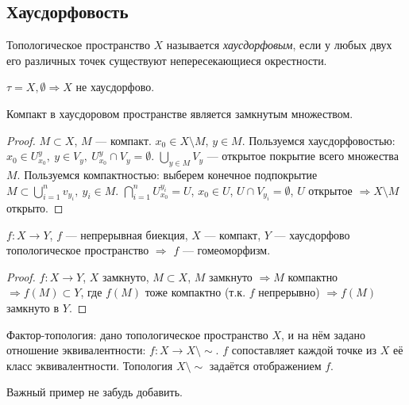 \subsection{Хаусдорфовость}
\begin{definition}
    Топологическое пространство $X$ называется \textit{хаусдорфовым}, если у любых двух его различных точек существуют непересекающиеся окрестности.
\end{definition}

$\tau = {X, \emptyset} \Rightarrow X$ не хаусдорфово.

\begin{lemma}
    Компакт в хаусдоровом пространстве является замкнутым множеством.
\end{lemma}
\begin{proof}
    $M \subset X$, $M$ — компакт.
    $x_0 \in X \setminus M$, $y \in M$.
    Пользуемся хаусдорфовостью: $x_0 \in U_{x_0}^y, \ y \in V_y, \ U_{x_0}^y \cap V_y = \emptyset$.
    $\bigcup_{y \in M} V_y$ — открытое покрытие всего множества $M$.
    Пользуемся компактностью: выберем конечное подпокрытие $M \subset \bigcup_{i = 1}^n v_{y_i}, \ y_i \in M$.
    $\bigcap_{i = 1}^n U_{x_0}^{y_i} = U$, $x_0 \in U$, $U \cap V_{y_i} = \emptyset$, $U$ открытое $\Rightarrow X \setminus M$ открыто.
\end{proof}

\begin{statement}
    $f: X \to Y$, $f$ — непрерывная биекция, $X$ — компакт, $Y$ — хаусдорфово топологическое пространство $\Longrightarrow$ $f$ — гомеоморфизм.
\end{statement}
\begin{proof}
    $f: X \to Y$, $X$ замкнуто, $M \subset X$, $M$ замкнуто $\Rightarrow M$ компактно $\Rightarrow f(M) \subset Y$, где $f(M)$ тоже компактно (т.к. $f$ непрерывно) $\Rightarrow f(M)$ замкнуто в $Y$. 
\end{proof}

Фактор-топология: дано топологическое пространство $X$, и на нём задано отношение эквивалентности: $f: X \to X \setminus \sim$. $f$ сопоставляет каждой точке из $X$ её класс эквивалентности.
Топология $X \setminus \sim$ задаётся отображением $f$.

Важный пример не забудь добавить.

